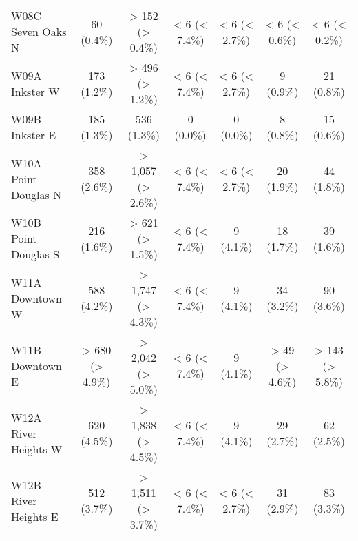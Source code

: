 \documentclass{article}
\begin{document}
\begin{table}[htbp]
\begin{tabular}{l*{6}{c}}
  W08C Seven Oaks N                                     &            60 (0.4\%)           &         > 152 (> 0.4\%)         &          < 6 (< 7.4\%)          &          < 6 (< 2.7\%)          &          < 6 (< 0.6\%)          &          < 6 (< 0.2\%)          \\
  W09A Inkster W                                        &           173 (1.2\%)           &         > 496 (> 1.2\%)         &          < 6 (< 7.4\%)          &          < 6 (< 2.7\%)          &            9 (0.9\%)            &            21 (0.8\%)           \\
  W09B Inkster E                                        &           185 (1.3\%)           &           536 (1.3\%)           &            0 (0.0\%)            &            0 (0.0\%)            &            8 (0.8\%)            &            15 (0.6\%)           \\
  W10A Point Douglas N                                  &           358 (2.6\%)           &        > 1,057 (> 2.6\%)        &          < 6 (< 7.4\%)          &          < 6 (< 2.7\%)          &            20 (1.9\%)           &            44 (1.8\%)           \\
  W10B Point Douglas S                                  &           216 (1.6\%)           &         > 621 (> 1.5\%)         &          < 6 (< 7.4\%)          &            9 (4.1\%)            &            18 (1.7\%)           &            39 (1.6\%)           \\
  W11A Downtown W                                       &           588 (4.2\%)           &        > 1,747 (> 4.3\%)        &          < 6 (< 7.4\%)          &            9 (4.1\%)            &            34 (3.2\%)           &            90 (3.6\%)           \\
  W11B Downtown E                                       &         > 680 (> 4.9\%)         &        > 2,042 (> 5.0\%)        &          < 6 (< 7.4\%)          &            9 (4.1\%)            &          > 49 (> 4.6\%)         &         > 143 (> 5.8\%)         \\
  W12A River Heights W                                  &           620 (4.5\%)           &        > 1,838 (> 4.5\%)        &          < 6 (< 7.4\%)          &            9 (4.1\%)            &            29 (2.7\%)           &            62 (2.5\%)           \\
  W12B River Heights E                                  &           512 (3.7\%)           &        > 1,511 (> 3.7\%)        &          < 6 (< 7.4\%)          &          < 6 (< 2.7\%)          &            31 (2.9\%)           &            83 (3.3\%)           \\

\end{tabular}
\end{table}
\end{document}
